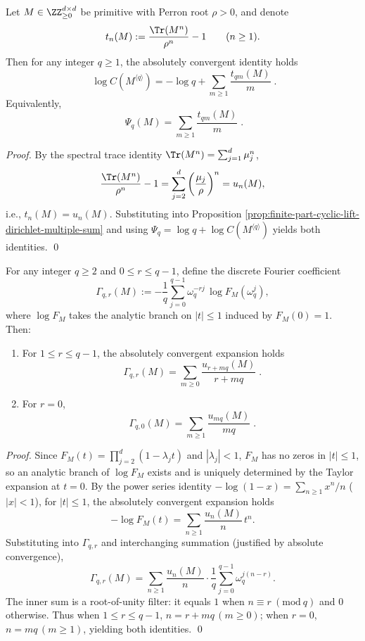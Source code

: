 \begin{corollary}\label{cor:finite-part-cyclic-lift-trace-sieve}
Let \(M\in\ZZ_{\ge 0}^{d\times d}\) be primitive with Perron root \(\rho>0\), and denote
\[
t_n(M):=\frac{\Tr(M^n)}{\rho^n}-1\qquad(n\ge 1).
\]
Then for any integer \(q\ge 1\), the absolutely convergent identity holds
\[
\boxed{\;
\log C(M^{\langle q\rangle})
=-\log q+\sum_{m\ge 1}\frac{t_{qm}(M)}{m}\; }.
\]
Equivalently,
\[
\boxed{\;
\Psi_q(M)=\sum_{m\ge 1}\frac{t_{qm}(M)}{m}\; }.
\]
\end{corollary}
\begin{proof}
By the spectral trace identity \(\Tr(M^n)=\sum_{j=1}^{d}\mu_j^n\),
\[
\frac{\Tr(M^n)}{\rho^n}-1=\sum_{j=2}^{d}\left(\frac{\mu_j}{\rho}\right)^{n}=u_n(M),
\]
i.e., \(t_n(M)=u_n(M)\).
Substituting into Proposition \ref{prop:finite-part-cyclic-lift-dirichlet-multiple-sum} and using \(\Psi_q=\log q+\log C(M^{\langle q\rangle})\) yields both identities. \qed
\end{proof}

\begin{proposition}\label{prop:finite-part-cyclic-lift-root-unity-fourier-sieve}
For any integer \(q\ge 2\) and \(0\le r\le q-1\), define the discrete Fourier coefficient
\[
\Gamma_{q,r}(M):=-\frac{1}{q}\sum_{j=0}^{q-1}\omega_q^{-rj}\,\log F_M(\omega_q^j),
\]
where \(\log F_M\) takes the analytic branch on \(|t|\le 1\) induced by \(F_M(0)=1\).
Then:
\begin{enumerate}
  \item For \(1\le r\le q-1\), the absolutely convergent expansion holds
  \[
  \boxed{\;
  \Gamma_{q,r}(M)=\sum_{m\ge 0}\frac{u_{r+mq}(M)}{r+mq}\; }.
  \]
  \item For \(r=0\),
  \[
  \boxed{\;
  \Gamma_{q,0}(M)=\sum_{m\ge 1}\frac{u_{mq}(M)}{mq}\; }.
  \]
\end{enumerate}
\end{proposition}
\begin{proof}
Since \(F_M(t)=\prod_{j=2}^{d}(1-\lambda_j t)\) and \(|\lambda_j|<1\), \(F_M\) has no zeros in \(|t|\le 1\), so an analytic branch of \(\log F_M\) exists and is uniquely determined by the Taylor expansion at \(t=0\).
By the power series identity \(-\log(1-x)=\sum_{n\ge 1}x^n/n\) (\(|x|<1\)), for \(|t|\le 1\), the absolutely convergent expansion holds
\[
-\log F_M(t)=\sum_{n\ge 1}\frac{u_n(M)}{n}\,t^n.
\]
Substituting into \(\Gamma_{q,r}\) and interchanging summation (justified by absolute convergence),
\[
\Gamma_{q,r}(M)=\sum_{n\ge 1}\frac{u_n(M)}{n}\cdot \frac{1}{q}\sum_{j=0}^{q-1}\omega_q^{j(n-r)}.
\]
The inner sum is a root-of-unity filter: it equals \(1\) when \(n\equiv r\ (\mathrm{mod}\ q)\) and \(0\) otherwise.
Thus when \(1\le r\le q-1\), \(n=r+mq\,(m\ge 0)\); when \(r=0\), \(n=mq\,(m\ge 1)\), yielding both identities. \qed
\end{proof}

